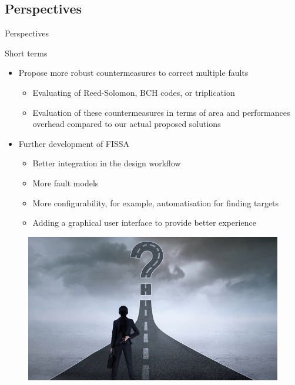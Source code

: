 \subsection{Perspectives}
\begin{frame}{Perspectives}
    \begin{block}{Short terms}
        \begin{itemize}
            [triangle]
            \item<1> Propose more robust countermeasures to correct multiple faults
                \begin{itemize}
                    \item Evaluating of Reed-Solomon, BCH codes, or triplication
                    \item Evaluation of these countermeasures in terms of area and performances overhead compared to our actual proposed solutions
                \end{itemize}
            \item<2> Further development of FISSA
                \begin{itemize}
                    \item Better integration in the design workflow
                    \item More fault models
                    \item More configurability, for example, automatisation for finding targets
                    \item Adding a graphical user interface to provide better experience
                \end{itemize}
        \end{itemize}
    \end{block}
    
    \begin{figure}
        \centering
        \includegraphics[height=.25\textheight]{src/6_conclusion/img/perspectives.jpg}
    \end{figure}
\end{frame}
